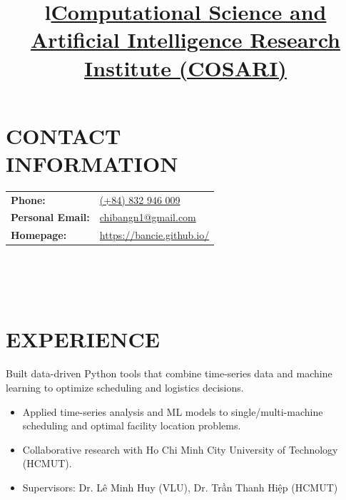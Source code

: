 \documentclass[margin]{res}
\begin{document}
\thispagestyle{fancy}


\begin{resume}

  \section{CONTACT\\INFORMATION}
  \begin{tabular}[t]{@{}l@{\quad}l@{}}
    \textbf{Phone:} & \href{tel:+84832946009}{(+84) 832 946 009} \\
    \textbf{Personal Email:} & \href{mailto:chibangn1@gmail.com}{chibangn1@gmail.com} \\
    \textbf{Homepage:} & \href{https://bancie.github.io/}{https://bancie.github.io/}
  \end{tabular}



  \begin{format}
    \title{l}\\
    \\
    \body\\
  \end{format}

  \section{EXPERIENCE}
  

  \title{\href{https://www.vlu.edu.vn/institute/vien-khoa-hoc-tinh-toan-va-tri-tue-nhan-tao}{\textbf{Computational Science and Artificial Intelligence Research Institute (COSARI)}}}
  \begin{position}
    Built data-driven Python tools that combine time-series data and machine learning to optimize scheduling and logistics decisions.
    \begin{itemize}
      \item Applied time-series analysis and ML models to single/multi-machine scheduling and optimal facility location problems.
      \item Collaborative research with Ho Chi Minh City University of Technology (HCMUT).
      \item Supervisors: Dr. Lê Minh Huy (VLU), Dr. Trần Thanh Hiệp (HCMUT)
    \end{itemize}
  \end{position}


\end{resume}
\end{document}
